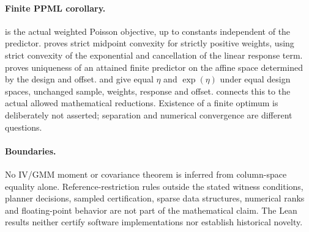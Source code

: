 \paragraph{Finite PPML corollary.}
 is the actual weighted Poisson objective, up to constants
independent of the predictor.  proves strict
midpoint convexity for strictly positive weights, using strict convexity of
the exponential and cancellation of the linear response term.
 proves uniqueness of an attained finite
predictor on the affine space determined by the design and offset.
 and
 give equal $\eta$ and $\exp(\eta)$
under equal design spaces, unchanged sample, weights, response and offset.
 connects this to the actual allowed mathematical
reductions. Existence of a finite optimum is deliberately not asserted;
separation and numerical convergence are different questions.

\paragraph{Boundaries.}
No IV/GMM moment or covariance theorem is inferred from column-space equality
alone. Reference-restriction rules outside the stated witness conditions,
planner decisions, sampled certification, sparse data structures, numerical
ranks and floating-point behavior are not part of the mathematical claim.
The Lean results neither certify software implementations nor establish
historical novelty.
